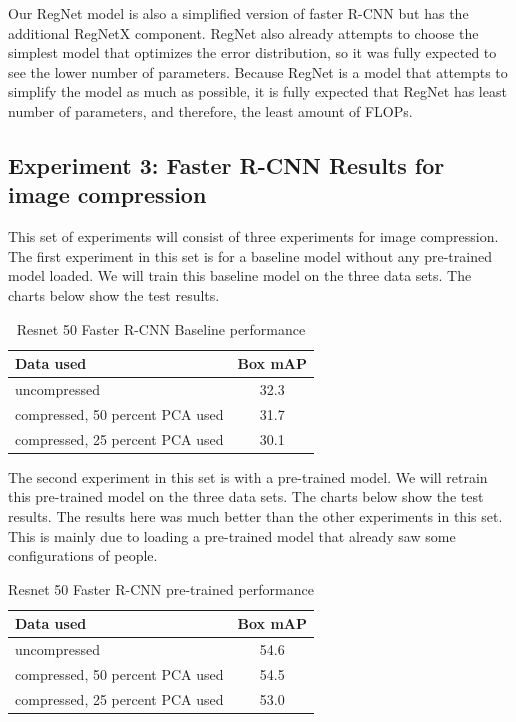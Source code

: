 \documentclass[10pt,twocolumn,letterpaper]{article}
\begin{document}
Our RegNet model is also a simplified version of faster R-CNN but has the additional RegNetX component. RegNet also already attempts to choose the simplest model that optimizes the error distribution, so it was fully expected to see the lower number of parameters. Because RegNet is a model that attempts to simplify the model as much as possible, it is fully expected that RegNet has least number of parameters, and therefore, the least amount of FLOPs. 

\subsection{Experiment 3: Faster R-CNN Results for image compression}
This set of experiments will consist of three experiments for image compression. The first experiment in this set is for a baseline model without any pre-trained model loaded.  We will train this baseline model on the three data sets. The charts below show the test results.

\begin{table}[hbt!]
\begin{center}
\begin{tabular}{|l|c|}
\hline
Data used   & Box mAP \\
\hline\hline
uncompressed & 32.3 \\
compressed, 50 percent PCA used & 31.7 \\
compressed, 25 percent PCA used & 30.1 \\
\hline
\end{tabular}
\end{center}
\caption{Resnet 50 Faster R-CNN Baseline performance}
\end{table}

The second experiment in this set is with a pre-trained model.  We will retrain this pre-trained model on the three data sets. The charts below show the test results. The results here was much better than the other experiments in this set. This is mainly due to loading a pre-trained model that already saw some configurations of people. 

\begin{table}[hbt!]
\begin{center}
\begin{tabular}{|l|c|}
\hline
Data used   & Box mAP \\
\hline\hline
uncompressed & 54.6 \\
compressed, 50 percent PCA used & 54.5 \\
compressed, 25 percent PCA used & 53.0 \\
\hline
\end{tabular}
\end{center}
\caption{Resnet 50 Faster R-CNN pre-trained performance}
\end{table}
\end{document}
